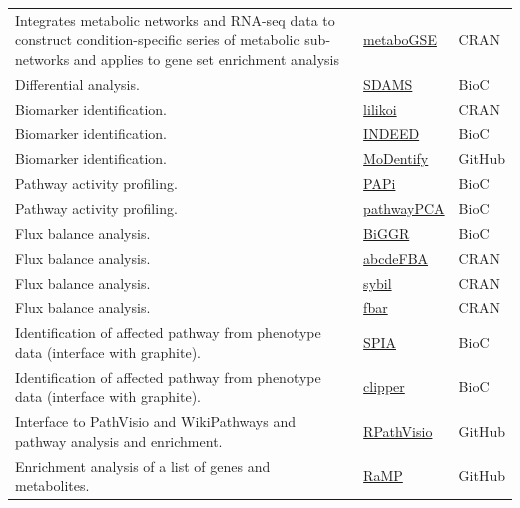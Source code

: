 \documentclass[]{article}
\begin{document}
\begin{longtable}{>{\raggedright\arraybackslash}p{30em}>{\raggedright\arraybackslash}p{10em}>{\raggedright\arraybackslash}p{3em}}
\rowcolor{gray!6}  Integrates metabolic networks and RNA-seq data to construct condition-specific series of metabolic sub-networks and applies to gene set enrichment analysis & \href{https://cran.r-project.org/package=metaboGSE}{metaboGSE} & CRAN\\
Differential analysis. & \href{https://bioconductor.org/packages/release/bioc/html/SDAMS.html}{SDAMS} & BioC\\
\rowcolor{gray!6}  Biomarker identification. & \href{https://cran.r-project.org/package=lilikoi}{lilikoi} & CRAN\\
Biomarker identification. & \href{https://bioconductor.org/packages/release/bioc/html/INDEED.html}{INDEED} & BioC\\
\rowcolor{gray!6}  Biomarker identification. & \href{https://github.com/krumsieklab/MoDentify}{MoDentify} & GitHub\\
Pathway activity profiling. & \href{https://doi.org/doi:10.18129/B9.bioc.PAPi}{PAPi} & BioC\\
\rowcolor{gray!6}  Pathway activity profiling. & \href{https://www.bioconductor.org/packages/devel/bioc/html/pathwayPCA.html}{pathwayPCA} & BioC\\
Flux balance analysis. & \href{https://bioconductor.org/packages/release/bioc/html/BiGGR.html}{BiGGR} & BioC\\
\rowcolor{gray!6}  Flux balance analysis. & \href{https://cran.r-project.org/package=abcdeFBA}{abcdeFBA} & CRAN\\
Flux balance analysis. & \href{https://cran.r-project.org/package=sybil}{sybil} & CRAN\\
\rowcolor{gray!6}  Flux balance analysis. & \href{https://cran.r-project.org/package=fbar}{fbar} & CRAN\\
Identification of affected pathway from phenotype data (interface with graphite). & \href{https://www.bioconductor.org/packages/release/bioc/html/SPIA.html}{SPIA} & BioC\\
\rowcolor{gray!6}  Identification of affected pathway from phenotype data (interface with graphite). & \href{https://www.bioconductor.org/packages/release/bioc/html/clipper.html}{clipper} & BioC\\
Interface to PathVisio and WikiPathways and pathway analysis and enrichment. & \href{https://github.com/PathVisio/RpathVisio}{RPathVisio} & GitHub\\
\rowcolor{gray!6}  Enrichment analysis of a list of genes and metabolites. & \href{https://github.com/Mathelab/RaMP-DB}{RaMP} & GitHub\\

\end{longtable}
\end{document}
